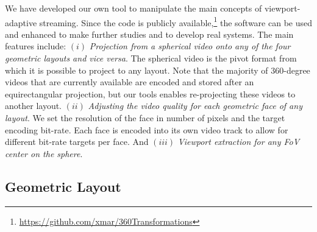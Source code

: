 We have developed our own tool to manipulate the main
concepts of viewport-adaptive streaming. Since the code is publicly
available,\footnote{\url{https://github.com/xmar/360Transformations}}
the software can be used and enhanced to make further studies and to
develop real systems. The main features include: $(i)$
\emph{Projection from a spherical video onto any of the four geometric
layouts and vice versa}. The spherical video is the pivot format from
which it is possible to project to any layout. Note that the majority
of 360-degree videos that are currently available are encoded and
stored after an equirectangular projection, but our tools enables
re-projecting these videos to another layout.  $(ii)$ \emph{Adjusting the video quality for each
geometric face of any layout}. We set the resolution of the face in
number of pixels and the target encoding bit-rate. Each face is
encoded into its own video track to allow for different bit-rate
targets per face. And $(iii)$ \emph{Viewport extraction for any
\ac{FoV} center on the sphere}. 

\subsection{Geometric Layout}

